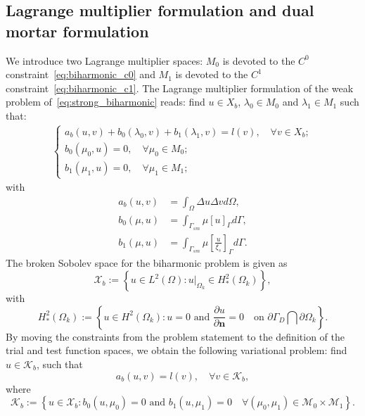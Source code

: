 \documentclass[preprint,12pt]{elsarticle}
\begin{document}
\subsection{Lagrange multiplier formulation and dual mortar formulation}
We introduce two Lagrange multiplier spaces: $M_0$ is devoted to the $C^0$ constraint~\eqref{eq:biharmonic_c0} and $M_1$ is devoted to the $C^1$ constraint~\eqref{eq:biharmonic_c1}. The Lagrange multiplier formulation of the weak problem of~\eqref{eq:strong_biharmonic} reads: find $u\in{X_b}$, $\lambda_0\in{M_0}$ and $\lambda_1\in{M_1}$ such that:
\begin{align}
    \begin{cases}
        a_b(u,v)+b_0(\lambda_0,v)+b_1(\lambda_1,v)=l(v),\quad\forall v\in{X_b};\\
        b_0(\mu_0,u)=0, \quad\forall \mu_0\in{M_0};\\
        b_1(\mu_1,u)=0, \quad\forall \mu_1\in{M_1};
    \end{cases}\label{eq:biharmonic_mixed}
\end{align}
with
\begin{align}
    a_b(u,v)&=\int_\Omega\Delta{u}\Delta{v}d\Omega,\\
    b_0(\mu,u)&=\int_{\Gamma_{sm}}\mu\left[u\right]_{\Gamma}d\Gamma,\\
    b_1(\mu,u)&=\int_{\Gamma_{sm}}\mu\left[\frac{u}{\xi_s}\right]_{\Gamma}d\Gamma.
\end{align}
The broken Sobolev space for the biharmonic problem is given as
\begin{equation}
    \mathcal{X}_b:=\left\{u\in{}L^2(\Omega): u\vert_{\Omega_k}\in{}H^2_*(\Omega_k)\right\},
\end{equation}
with 
\begin{equation}
    H^2_*(\Omega_k):=\left\{u\in{}H^2(\Omega_k): u=0 \text{ and }\frac{\partial{u}}{\partial{\mathbf{n}}}=0\quad\text{on } \partial\Gamma_D\bigcap\partial\Omega_k \right\}.
\end{equation}
By moving the constraints from the problem statement to the definition of the trial and test function spaces, we obtain the following variational problem: find $u\in{\mathcal{K}_b}$, such that
\begin{equation}
    a_b(u,v)=l(v), \quad\forall{v\in{\mathcal{K}_b}},
\end{equation}
where
\begin{equation}
    \mathcal{K}_b:=\left\{u\in{}\mathcal{X}_b: b_0(u, \mu_0)=0 \text{ and }b_1(u, \mu_1)=0\quad\forall(\mu_0,\mu_1)\in{\mathcal{M}_0\times{}\mathcal{M}_1}\right\}.\label{eq:biharmonic_reduced}
\end{equation}
\end{document}
